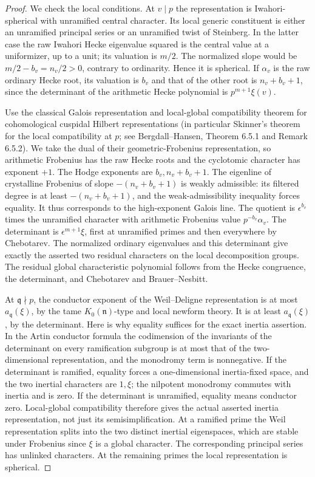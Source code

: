 \begin{proof}
We check the local conditions. At \(v\mid p\) the representation
is Iwahori-spherical with unramified central character. Its local
generic constituent is either an unramified principal series or
an unramified twist of Steinberg. In the latter case the raw
Iwahori Hecke eigenvalue squared is the central value at a
uniformizer, up to a unit; its valuation is \(m/2\).
The normalized slope would be \(m/2-b_v=n_v/2>0\), contrary
to ordinarity. Hence it is spherical. If \(\alpha_v\) is the raw
ordinary Hecke root, its valuation is \(b_v\) and that of the
other root is \(n_v+b_v+1\), since the determinant of the
arithmetic Hecke polynomial is \(p^{m+1}\xi(v)\).

Use the classical Galois representation and local-global
compatibility theorem for cohomological cuspidal Hilbert
representations (in particular Skinner's theorem for the local
compatibility at \(p\); see Bergdall--Hansen, Theorem 6.5.1 and
Remark 6.5.2). We take the dual of their geometric-Frobenius
representation, so arithmetic Frobenius has the raw Hecke roots
and the cyclotomic character has exponent \(+1\). The Hodge
exponents are \(b_v,n_v+b_v+1\). The eigenline of crystalline
Frobenius of slope \(-(n_v+b_v+1)\) is weakly admissible:
its filtered degree is at least \(-(n_v+b_v+1)\), and the
weak-admissibility inequality forces equality. It thus corresponds
to the high-exponent Galois line. The quotient is
\(\epsilon^{b_v}\) times the unramified character with arithmetic
Frobenius value \(p^{-b_v}\alpha_v\).
The determinant is \(\epsilon^{m+1}\xi\), first at unramified
primes and then everywhere by Chebotarev. The normalized
ordinary eigenvalues and this determinant give exactly the asserted
two residual characters on the local decomposition groups.
The residual global characteristic polynomial follows from the
Hecke congruence, the determinant, and Chebotarev and
Brauer--Nesbitt.

At \(\mathfrak q\nmid p\), the conductor exponent of the
Weil--Deligne representation is at most \(a_{\mathfrak q}(\xi)\),
by the tame \(K_0(\mathfrak n)\)-type and local newform theory.
It is at least \(a_{\mathfrak q}(\xi)\), by the determinant.
Here is why equality suffices for the exact inertia assertion.
In the Artin conductor formula the codimension of the invariants
of the determinant on every ramification subgroup is at most
that of the two-dimensional representation, and the monodromy
term is nonnegative. If the determinant is ramified, equality
forces a one-dimensional inertia-fixed space, and the two
inertial characters are \(1,\xi\); the nilpotent monodromy
commutes with inertia and is zero. If the determinant is
unramified, equality means conductor zero. Local-global
compatibility therefore gives the actual asserted inertia
representation, not just its semisimplification. At a ramified
prime the Weil representation splits into the two distinct
inertial eigenspaces, which are stable under Frobenius since
\(\xi\) is a global character. The corresponding principal series
has unlinked characters. At the remaining primes the local
representation is spherical.


\end{proof}
